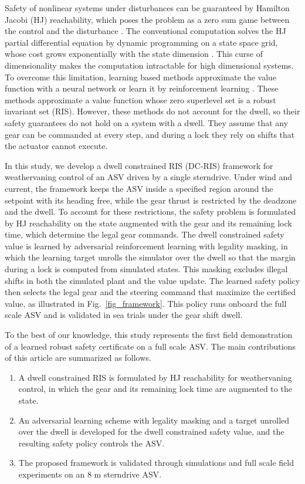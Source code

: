 \documentclass[lettersize,journal]{IEEEtran}
\begin{document}
Safety of nonlinear systems under disturbances can be guaranteed by Hamilton Jacobi (HJ) reachability, which poses the problem as a zero sum game between the control and the disturbance \cite{mitchell2005time,bansal2017}. The conventional computation solves the HJ partial differential equation by dynamic programming on a state space grid, whose cost grows exponentially with the state dimension \cite{bansal2017}. This curse of dimensionality makes the computation intractable for high dimensional systems. To overcome this limitation, learning based methods approximate the value function with a neural network \cite{bansal2021deepreach} or learn it by reinforcement learning \cite{fisac2019,yu2022,li2023cdc}. These methods approximate a value function whose zero superlevel set is a robust invariant set (RIS). However, these methods do not account for the dwell, so their safety guarantees do not hold on a system with a dwell. They assume that any gear can be commanded at every step, and during a lock they rely on shifts that the actuator cannot execute.

In this study, we develop a dwell constrained RIS (DC-RIS) framework for weathervaning control of an ASV driven by a single sterndrive. Under wind and current, the framework keeps the ASV inside a specified region around the setpoint with its heading free, while the gear thrust is restricted by the deadzone and the dwell. To account for these restrictions, the safety problem is formulated by HJ reachability on the state augmented with the gear and its remaining lock time, which determine the legal gear commands. The dwell constrained safety value is learned by adversarial reinforcement learning with legality masking, in which the learning target unrolls the simulator over the dwell so that the margin during a lock is computed from simulated states. This masking excludes illegal shifts in both the simulated plant and the value update. The learned safety policy then selects the legal gear and the steering command that maximize the certified value, as illustrated in Fig.~\ref{fig_framework}. This policy runs onboard the full scale ASV and is validated in sea trials under the gear shift dwell.

To the best of our knowledge, this study represents the first field demonstration of a learned robust safety certificate on a full scale ASV. The main contributions of this article are summarized as follows.
\begin{enumerate}
\item A dwell constrained RIS is formulated by HJ reachability for weathervaning control, in which the gear and its remaining lock time are augmented to the state.
\item An adversarial learning scheme with legality masking and a target unrolled over the dwell is developed for the dwell constrained safety value, and the resulting safety policy controls the ASV.
\item The proposed framework is validated through simulations and full scale field experiments on an 8 m sterndrive ASV.
\end{enumerate}
\end{document}
